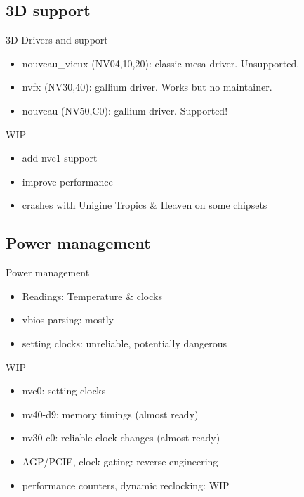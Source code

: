 \documentclass[11pt,english,compress]{beamer}
\begin{document}
	\subsection{3D support}
		\begin{frame}
			\begin{block}{3D Drivers and support}
				\begin{itemize}
					\item nouveau\_vieux (NV04,10,20): classic mesa driver. Unsupported.
					\item nvfx (NV30,40): gallium driver. Works but no maintainer.
					\item nouveau (NV50,C0): gallium driver. Supported! 
				\end{itemize}
			\end{block}
	
			\begin{block}{WIP}
				\begin{itemize}
					\item add nvc1 support
					\item improve performance
					\item crashes with Unigine Tropics \& Heaven on some chipsets
				\end{itemize}
			\end{block}
		\end{frame}

	\subsection{Power management}
		\begin{frame}
			\begin{block}{Power management}
 				\begin{itemize}
					\item Readings: Temperature \& clocks
					\item vbios parsing: mostly
					\item setting clocks: unreliable, potentially dangerous
				\end{itemize}
			\end{block}

			\begin{block}{WIP}
				\begin{itemize}
					\item nvc0: setting clocks
					\item nv40-d9: memory timings (almost ready)
					\item nv30-c0: reliable clock changes (almost ready)
					\item AGP/PCIE, clock gating: reverse engineering
					\item performance counters, dynamic reclocking: WIP
				\end{itemize}
			\end{block}
		\end{frame}
\end{document}
